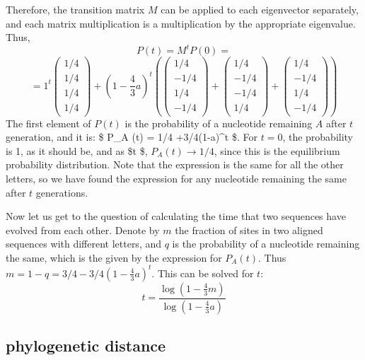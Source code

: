 \documentclass[
]{book}
\theoremstyle{definition}
\theoremstyle{definition}
\theoremstyle{definition}
\theoremstyle{remark}
\begin{document}
Therefore, the transition matrix \(M\) can be applied to each eigenvector separately, and each matrix multiplication is a multiplication by the appropriate eigenvalue. Thus,
\[ P(t) = M^t P(0) =  \]
\[ = 1^t \left(\begin{array}{c} 1/4 \\ 1/4 \\ 1/4 \\ 1/4 \end{array}\right) + (1-\frac{4}{3}a)^t\left( \left(\begin{array}{c} 1/4 \\ -1/4 \\ 1/4 \\ -1/4 \end{array}\right) +  \left(\begin{array}{c} 1/4 \\ -1/4 \\ -1/4 \\ 1/4 \end{array}\right) + \left(\begin{array}{c} 1/4 \\ -1/4 \\ 1/4 \\ -1/4 \end{array}\right) \right)\]
The first element of \(P(t)\) is the probability of a nucleotide remaining \(A\) after \(t\) generation, and it is: \$ P\_A (t) = 1/4 +3/4(1-a)\^{}t \$. For \(t=0\), the probability is 1, as it should be, and as \$t \rightarrow \infty \$, \(P_A (t) \rightarrow 1/4\), since this is the equilibrium probability distribution. Note that the expression is the same for all the other letters, so we have found the expression for any nucleotide remaining the same after \(t\) generations.

Now let us get to the question of calculating the time that two sequences have evolved from each other. Denote by \(m\) the fraction of sites in two aligned sequences with different letters, and \(q\) is the probability of a nucleotide remaining the same, which is the given by the expression for \(P_A(t)\). Thus \(m = 1 - q = 3/4 - 3/4(1-\frac{4}{3}a)^t\). This can be solved for \(t\):
\[ t = \frac{\log (1 -  \frac{4}{3} m)}{\log (1 -  \frac{4}{3} a)}\]

\hypertarget{phylogenetic-distance}{%
\subsection{phylogenetic distance}\label{phylogenetic-distance}}
\end{document}
